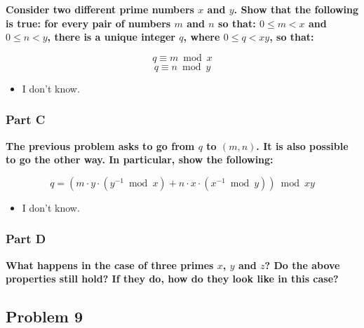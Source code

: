 \documentclass[11pt]{article}
\begin{document}
\textbf{Consider two different prime numbers $x$ and $y$. Show that the
following is true: for every pair of numbers $m$ and $n$ so that: $0
\leq m < x$ and $0 \leq n < y$, there is a unique integer $q$, where
$0 \leq q < xy$, so that:}

$$q \equiv m \bmod{x}$$
$$q \equiv n \bmod{y}$$

  \begin{itemize}
  
  \item I don't know.
  
  \end{itemize}
  
\subsubsection*{Part C}

\textbf{The previous problem asks to go from $q$ to $(m,n)$. It is also
possible to go the other way. In particular, show the following:}

$$q = ( m \cdot y \cdot (y^{-1} \bmod{x}) + n \cdot x \cdot
(x^{-1} \bmod{y}) ) \bmod{xy}$$

  \begin{itemize}
  
  \item I don't know.
  
  \end{itemize}

\subsubsection*{Part D} 

\textbf{What happens in the case of three primes $x$, $y$ and $z$? Do the
above properties still hold? If they do, how do they look like in this
case?}

\subsection*{Problem 9}
\end{document}
